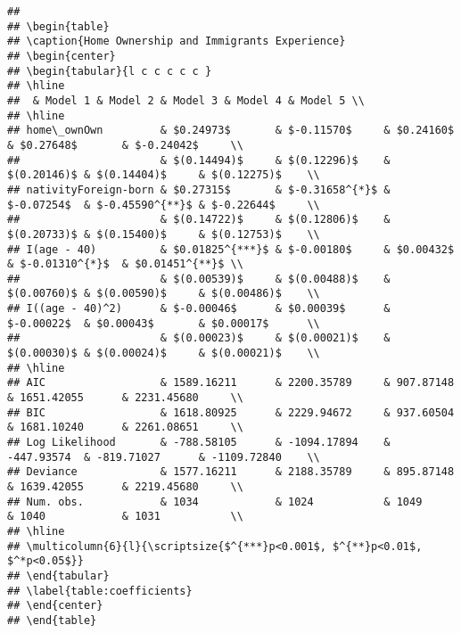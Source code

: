 \documentclass[11pt,]{article}
\begin{document}
\begin{verbatim}
## 
## \begin{table}
## \caption{Home Ownership and Immigrants Experience}
## \begin{center}
## \begin{tabular}{l c c c c c }
## \hline
##  & Model 1 & Model 2 & Model 3 & Model 4 & Model 5 \\
## \hline
## home\_ownOwn         & $0.24973$       & $-0.11570$     & $0.24160$   & $0.27648$       & $-0.24042$     \\
##                      & $(0.14494)$     & $(0.12296)$    & $(0.20146)$ & $(0.14404)$     & $(0.12275)$    \\
## nativityForeign-born & $0.27315$       & $-0.31658^{*}$ & $-0.07254$  & $-0.45590^{**}$ & $-0.22644$     \\
##                      & $(0.14722)$     & $(0.12806)$    & $(0.20733)$ & $(0.15400)$     & $(0.12753)$    \\
## I(age - 40)          & $0.01825^{***}$ & $-0.00180$     & $0.00432$   & $-0.01310^{*}$  & $0.01451^{**}$ \\
##                      & $(0.00539)$     & $(0.00488)$    & $(0.00760)$ & $(0.00590)$     & $(0.00486)$    \\
## I((age - 40)^2)      & $-0.00046$      & $0.00039$      & $-0.00022$  & $0.00043$       & $0.00017$      \\
##                      & $(0.00023)$     & $(0.00021)$    & $(0.00030)$ & $(0.00024)$     & $(0.00021)$    \\
## \hline
## AIC                  & 1589.16211      & 2200.35789     & 907.87148   & 1651.42055      & 2231.45680     \\
## BIC                  & 1618.80925      & 2229.94672     & 937.60504   & 1681.10240      & 2261.08651     \\
## Log Likelihood       & -788.58105      & -1094.17894    & -447.93574  & -819.71027      & -1109.72840    \\
## Deviance             & 1577.16211      & 2188.35789     & 895.87148   & 1639.42055      & 2219.45680     \\
## Num. obs.            & 1034            & 1024           & 1049        & 1040            & 1031           \\
## \hline
## \multicolumn{6}{l}{\scriptsize{$^{***}p<0.001$, $^{**}p<0.01$, $^*p<0.05$}}
## \end{tabular}
## \label{table:coefficients}
## \end{center}
## \end{table}
\end{verbatim}
\end{document}
